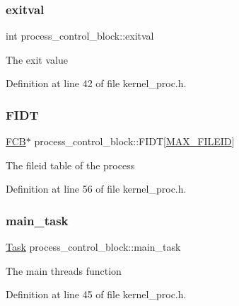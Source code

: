 \subsubsection{\texorpdfstring{exitval}{exitval}}
{\footnotesize\ttfamily int process\+\_\+control\+\_\+block\+::exitval}

The exit value 

Definition at line 42 of file kernel\+\_\+proc.\+h.

\mbox{\label{structprocess__control__block_aad72d85bd79a3100a497d11630a38977}} 
\subsubsection{\texorpdfstring{F\+I\+DT}{FIDT}}
{\footnotesize\ttfamily \hyperlink{group__streams_ga0c7e751afb9d6cadebf070961804d400}{F\+CB}$\ast$ process\+\_\+control\+\_\+block\+::\+F\+I\+DT\mbox{[}\hyperlink{group__syscalls_ga9c697bf9e856897ad75f28190a6f0b68}{M\+A\+X\+\_\+\+F\+I\+L\+E\+ID}\mbox{]}}

The fileid table of the process 

Definition at line 56 of file kernel\+\_\+proc.\+h.

\mbox{\label{structprocess__control__block_a7d4ddbf8f67ac2bfe9774796b818354e}} 
\subsubsection{\texorpdfstring{main\+\_\+task}{main\_task}}
{\footnotesize\ttfamily \hyperlink{group__syscalls_gaec3f2f835e105271fbbc00272c0ba984}{Task} process\+\_\+control\+\_\+block\+::main\+\_\+task}

The main thread\textquotesingle{}s function 

Definition at line 45 of file kernel\+\_\+proc.\+h.

\mbox{\label{structprocess__control__block_a3b7a2a952ec5c19d7331307639c78482}} 

